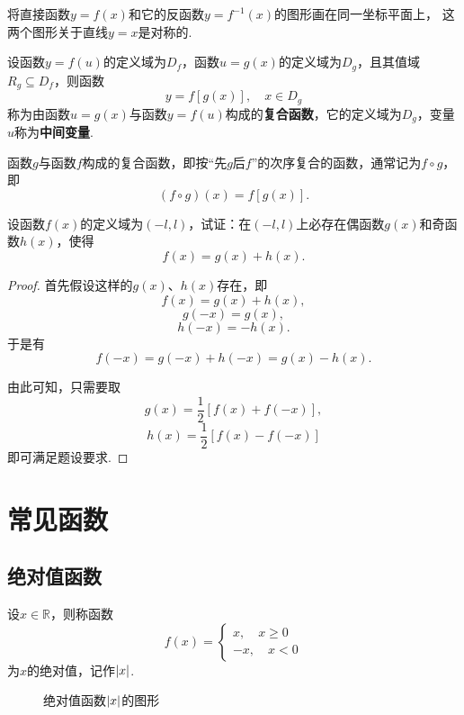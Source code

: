 \begin{property}
将直接函数\(y=f(x)\)和它的反函数\(y=f^{-1}(x)\)的图形画在同一坐标平面上，%
这两个图形关于直线\(y=x\)是对称的.
\end{property}

\begin{definition}
设函数\(y=f(u)\)的定义域为\(D_f\)，函数\(u=g(x)\)的定义域为\(D_g\)，且其值域\(R_g \subseteq D_f\)，则函数\[
y = f[g(x)],
\quad x \in D_g
\]称为由函数\(u=g(x)\)与函数\(y=f(u)\)构成的\textbf{复合函数}，它的定义域为\(D_g\)，变量\(u\)称为\textbf{中间变量}.

函数\(g\)与函数\(f\)构成的复合函数，即按“先\(g\)后\(f\)”的次序复合的函数，通常记为\(f \circ g\)，即\[
(f \circ g)(x) = f[g(x)].
\]
\end{definition}

\begin{example}
设函数\(f(x)\)的定义域为\((-l,l)\)，试证：在\((-l,l)\)上必存在偶函数\(g(x)\)和奇函数\(h(x)\)，使得\[
f(x) = g(x)+h(x).
\]
\begin{proof}
首先假设这样的\(g(x)\)、\(h(x)\)存在，即\[
f(x) = g(x) + h(x),
\]\[
g(-x) = g(x),
\]\[
h(-x) = -h(x).
\]于是有\[
f(-x) = g(-x) + h(-x) = g(x) - h(x).
\]

由此可知，只需要取\[
g(x) = \frac{1}{2} [f(x) + f(-x)],
\]\[
h(x) = \frac{1}{2} [f(x) - f(-x)]
\]即可满足题设要求.
\end{proof}
\end{example}

\section{常见函数}
\subsection{绝对值函数}
\begin{definition}[绝对值]
设\(x \in \mathbb{R}\)，则称函数\[
f(x) = \left\{ \begin{array}{c}
x, \quad x \geqslant 0 \\
-x, \quad x < 0
\end{array} \right.
\]为\(x\)的绝对值，记作\(\abs{x}\).
\end{definition}

\begin{figure}[ht]
\centering
{}
\caption{绝对值函数\(\abs{x}\)的图形}
\end{figure}

